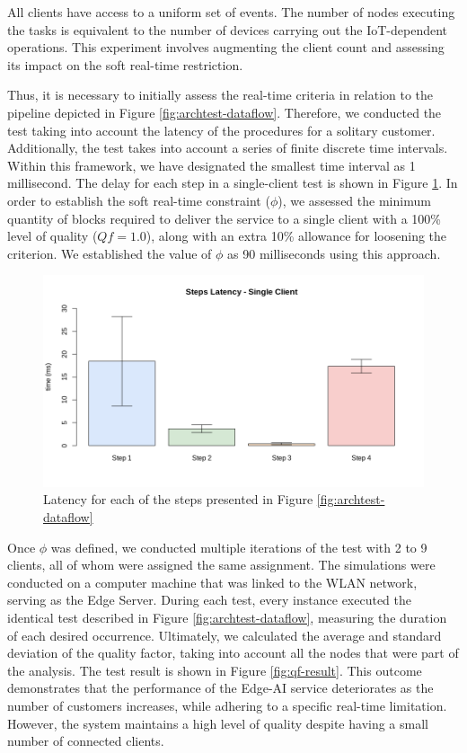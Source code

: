 All clients have access to a uniform set of events. The number of nodes executing the tasks is equivalent to the number of devices carrying out the IoT-dependent operations. This experiment involves augmenting the client count and assessing its impact on the soft real-time restriction.

Thus, it is necessary to initially assess the real-time criteria in relation to the pipeline depicted in Figure \ref{fig:archtest-dataflow}. Therefore, we conducted the test taking into account the latency of the procedures for a solitary customer. Additionally, the test takes into account a series of finite discrete time intervals. Within this framework, we have designated the smallest time interval as 1 millisecond. The delay for each step in a single-client test is shown in Figure \ref{fig:arch-steps-latency}. In order to establish the soft real-time constraint ($\phi$), we assessed the minimum quantity of blocks required to deliver the service to a single client with a 100\% level of quality ($Qf = 1.0$), along with an extra 10\% allowance for loosening the criterion. We established the value of $\phi$ as 90 milliseconds using this approach.

\begin{figure}[h!]
    \centering
    \includegraphics[width = .8\linewidth]{Figures/arch-steps-latency.png}
    \caption{Latency for each of the steps presented in Figure \ref{fig:archtest-dataflow}}
    \label{fig:arch-steps-latency}
\end{figure}

Once $\phi$ was defined, we conducted multiple iterations of the test with 2 to 9 clients, all of whom were assigned the same assignment. The simulations were conducted on a computer machine that was linked to the WLAN network, serving as the Edge Server. During each test, every instance executed the identical test described in Figure \ref{fig:archtest-dataflow}, measuring the duration of each desired occurrence. Ultimately, we calculated the average and standard deviation of the quality factor, taking into account all the nodes that were part of the analysis. The test result is shown in Figure \ref{fig:qf-result}. This outcome demonstrates that the performance of the Edge-AI service deteriorates as the number of customers increases, while adhering to a specific real-time limitation. However, the system maintains a high level of quality despite having a small number of connected clients.

